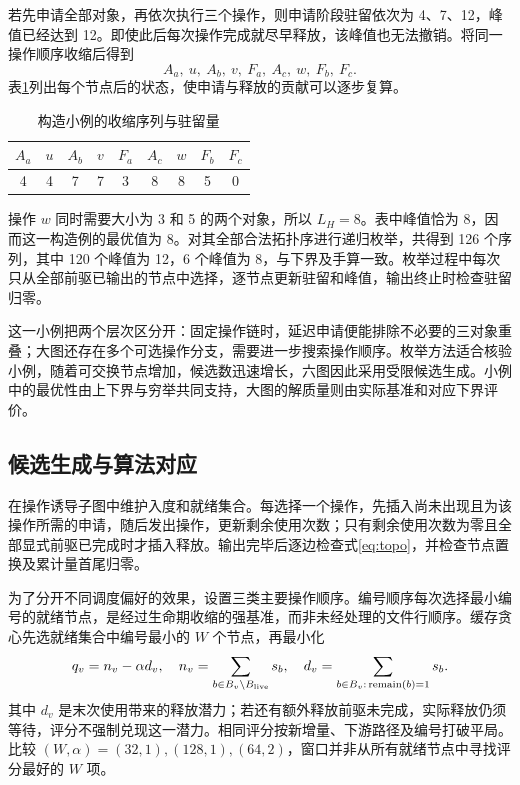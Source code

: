 若先申请全部对象，再依次执行三个操作，则申请阶段驻留依次为 4、7、12，峰值已经达到 12。即使此后每次操作完成就尽早释放，该峰值也无法撤销。将同一操作顺序收缩后得到
\begin{equation}
A_a,\ u,\ A_b,\ v,\ F_a,\ A_c,\ w,\ F_b,\ F_c.
\end{equation}
表\ref{tab:toy_life}列出每个节点后的状态，使申请与释放的贡献可以逐步复算。
\begin{table}[H]\centering{}
\caption{构造小例的收缩序列与驻留量}\label{tab:toy_life}
\begin{tabular}{ccccccccc}\toprule
$A_a$&$u$&$A_b$&$v$&$F_a$&$A_c$&$w$&$F_b$&$F_c$\\\midrule
4&4&7&7&3&8&8&5&0\\\bottomrule
\end{tabular}\end{table}

操作 $w$ 同时需要大小为 3 和 5 的两个对象，所以 $L_H=8$。表中峰值恰为 8，因而这一构造例的最优值为 8。对其全部合法拓扑序进行递归枚举，共得到 126 个序列，其中 120 个峰值为 12，6 个峰值为 8，与下界及手算一致。枚举过程中每次只从全部前驱已输出的节点中选择，逐节点更新驻留和峰值，输出终止时检查驻留归零。

这一小例把两个层次区分开：固定操作链时，延迟申请便能排除不必要的三对象重叠；大图还存在多个可选操作分支，需要进一步搜索操作顺序。枚举方法适合核验小例，随着可交换节点增加，候选数迅速增长，六图因此采用受限候选生成。小例中的最优性由上下界与穷举共同支持，大图的解质量则由实际基准和对应下界评价。

\subsection{候选生成与算法对应}
在操作诱导子图中维护入度和就绪集合。每选择一个操作，先插入尚未出现且为该操作所需的申请，随后发出操作，更新剩余使用次数；只有剩余使用次数为零且全部显式前驱已完成时才插入释放。输出完毕后逐边检查式\eqref{eq:topo}，并检查节点置换及累计量首尾归零。

为了分开不同调度偏好的效果，设置三类主要操作顺序。编号顺序每次选择最小编号的就绪节点，是经过生命期收缩的强基准，而非未经处理的文件行顺序。缓存贪心先选就绪集合中编号最小的 $W$ 个节点，再最小化
\begin{equation}
q_v=n_v-\alpha d_v,\quad
n_v=\sum_{b\in B_v\setminus B_{\rm live}}s_b,\quad
d_v=\sum_{b\in B_v:\,\operatorname{remain}(b)=1}s_b.\label{eq:greedy}
\end{equation}
其中 $d_v$ 是末次使用带来的释放潜力；若还有额外释放前驱未完成，实际释放仍须等待，评分不强制兑现这一潜力。相同评分按新增量、下游路径及编号打破平局。比较 $(W,\alpha)=(32,1),(128,1),(64,2)$，窗口并非从所有就绪节点中寻找评分最好的 $W$ 项。

